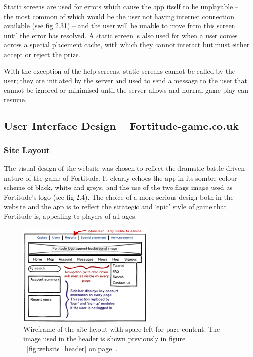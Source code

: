 Static screens are used for errors which cause the app itself to be unplayable – the most common of which would be the user not having internet connection available (see fig 2.31) – and the user will be unable to move from this screen until the error has resolved. A static screen is also used for when a user comes across a special placement cache, with which they cannot interact but must either accept or reject the prize.

With the exception of the help screens, static screens cannot be called by the user; they are initiated by the server and used to send a message to the user that cannot be ignored or minimised until the server allows and normal game play can resume.

\subsection{User Interface Design – Fortitude-game.co.uk}

\subsubsection{Site Layout}

The visual design of the website was chosen to reflect the dramatic battle-driven nature of the game of Fortitude. It clearly echoes the app in its sombre colour scheme of black, white and greys, and the use of the two flags image used as Fortitude’s logo (see fig 2.4). The choice of a more serious design both in the website and the app is to reflect the strategic and ‘epic’ style of game that Fortitude is, appealing to players of all ages.

\begin{figure}
	\vspace{-30pt}
	\begin{center}
	\includegraphics[width=0.6\textwidth]{images/website_wireframe}
	\caption{Wireframe of the site layout with space left for page content. The image used in the header is shown previously in figure ~\ref{fig:website_header} on page~\pageref{fig:website_header}.}
	\label{website_wireframe}
	\end{center}
	\vspace{-20pt}
\end{figure}

